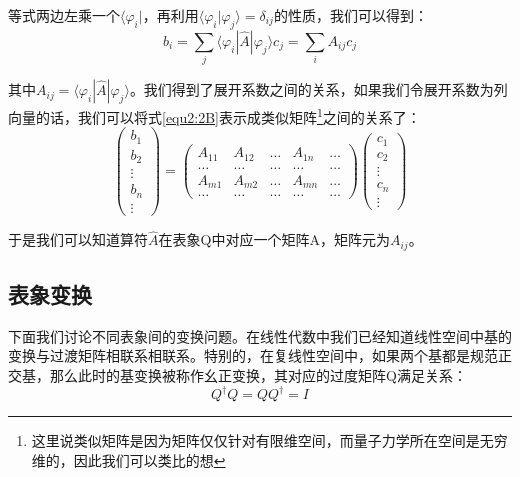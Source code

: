     等式两边左乘一个$\langle\varphi_i|$，再利用$\langle\varphi_i|\varphi_j\rangle=\delta_{ij}$的性质，我们可以得到：
    \begin{equation}\label{equ2:2B}
        b_i=\sum_j\langle\varphi_i|\hat{A}|\varphi_j\rangle c_j=\sum_i A_{ij}c_j
    \end{equation}
    
    其中$A_{ij}=\langle\varphi_i|\hat{A}|\varphi_j\rangle$。我们得到了展开系数之间的关系，如果我们令展开系数为列向量的话，我们可以将式\ref{equ2:2B}表示成类似矩阵\footnote{这里说类似矩阵是因为矩阵仅仅针对有限维空间，而量子力学所在空间是无穷维的，因此我们可以类比的想}之间的关系了：
    \begin{equation}
        \begin{pmatrix}
            b_1\\
            b_2\\
            \vdots\\
            b_n\\
            \vdots
        \end{pmatrix}=
        \begin{pmatrix}
            A_{11} & A_{12} & \dots & A_{1n} & \dots\\
            \dots&\dots&\dots&\dots&\dots\\
            A_{m1}&A_{m2}& \dots &A_{mn}&\dots\\
            \dots&\dots&\dots&\dots&\dots
        \end{pmatrix}
        \begin{pmatrix}
             c_1\\
            c_2\\
            \vdots\\
            c_n\\
            \vdots
        \end{pmatrix}
    \end{equation}
    
    于是我们可以知道算符$\hat{A}$在表象Q中对应一个矩阵A，矩阵元为$A_{ij}$。
    
    \subsection{表象变换}
    下面我们讨论不同表象间的变换问题。在线性代数中我们已经知道线性空间中基的变换与过渡矩阵相联系相联系。特别的，在复线性空间中，如果两个基都是规范正交基，那么此时的基变换被称作幺正变换，其对应的过度矩阵Q满足关系：
    \begin{equation}
        Q^\dagger Q=QQ^\dagger=I
    \end{equation}
    
